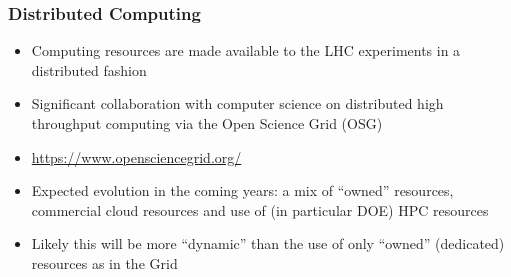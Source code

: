 \begin{frame}
\frametitle{Distributed Computing}
\begin{itemize}
\item Computing resources are made available to the LHC experiments in a distributed fashion
\item Significant collaboration with computer science on distributed high throughput computing via the Open Science Grid (OSG)
\item \url{https://www.opensciencegrid.org/}
\item Expected evolution in the coming years: a mix of ``owned'' resources, commercial cloud resources and use of (in particular DOE) HPC resources
\item Likely this will be more ``dynamic'' than the use of only ``owned'' (dedicated) resources as in the Grid
\end{itemize}

\end{frame}


